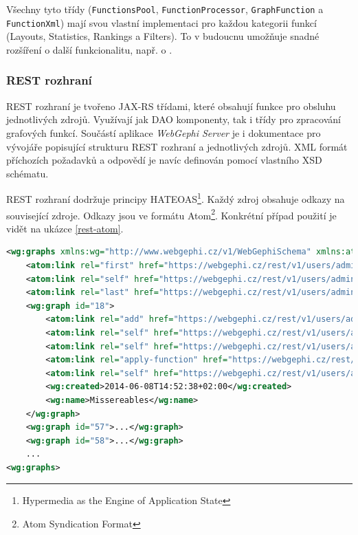 \documentclass[thesis=M,czech]{FITthesis}[2014/05/6]
\begin{document}
Všechny tyto třídy (\texttt{FunctionsPool}, \texttt{FunctionProcessor}, \texttt{GraphFunction} a \texttt{FunctionXml}) mají svou vlastní implementaci pro každou kategorii funkcí (Layouts, Statistics, Rankings a Filters).
To v budoucnu umožňuje snadné rozšíření o další funkcionalitu, např. o .

\subsubsection{REST rozhraní}
REST rozhraní je tvořeno JAX-RS třídami, které obsahují funkce pro obsluhu jednotlivých zdrojů. Využívají jak DAO komponenty, tak i třídy pro zpracování grafových funkcí.
Součástí aplikace \textit{WebGephi Server} je i dokumentace pro vývojáře popisující strukturu REST rozhraní a jednotlivých zdrojů. XML formát příchozích požadavků a odpovědí je navíc 
definován pomocí vlastního XSD schématu.

REST rozhraní dodržuje principy HATEOAS\footnote{Hypermedia as the Engine of Application State}. Každý zdroj obsahuje odkazy na související zdroje. Odkazy jsou
ve formátu Atom\footnote{Atom Syndication Format}. Konkrétní případ použití je vidět na ukázce \ref{rest-atom}.

\begin{lstlisting}[caption=Použití Atom odkazů k navigaci mezi REST službami, label=rest-atom, language=xml]
<wg:graphs xmlns:wg="http://www.webgephi.cz/v1/WebGephiSchema" xmlns:atom="http://www.w3.org/2005/Atom">
	<atom:link rel="first" href="https://webgephi.cz/rest/v1/users/admin/graphs?page=1" type="text/xml"/>
	<atom:link rel="self" href="https://webgephi.cz/rest/v1/users/admin/graphs?page=1" type="text/xml"/>
	<atom:link rel="last" href="https://webgephi.cz/rest/v1/users/admin/graphs?page=1" type="text/xml"/>
	<wg:graph id="18">
		<atom:link rel="add" href="https://webgephi.cz/rest/v1/users/admin/graphs" type="text/xml"/>
		<atom:link rel="self" href="https://webgephi.cz/rest/v1/users/admin/graphs/18/svg" type="image/svg+xml"/>
		<atom:link rel="self" href="https://webgephi.cz/rest/v1/users/admin/graphs/18/gexf" type="application/xml"/>
		<atom:link rel="apply-function" href="https://webgephi.cz/rest/v1/users/admin/graphs/18" type="text/xml"/>
		<atom:link rel="self" href="https://webgephi.cz/rest/v1/users/admin/graphs/18" type="text/xml"/>
		<wg:created>2014-06-08T14:52:38+02:00</wg:created>
		<wg:name>Missereables</wg:name>
	</wg:graph>
	<wg:graph id="57">...</wg:graph>		
	<wg:graph id="58">...</wg:graph>
	...
<wg:graphs>
\end{lstlisting} 
\end{document}
